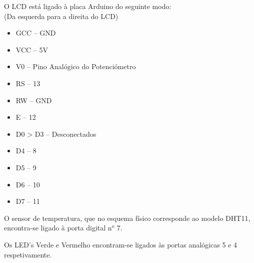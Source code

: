 O LCD está ligado à placa Arduino do seguinte modo:\\
(Da esquerda para a direita do LCD)
\begin{itemize}
    \item GCC -- GND
    \item VCC -- 5V
    \item V0 -- Pino Analógico do Potenciómetro
    \item RS -- 13
    \item RW -- GND
    \item E -- 12
    \item D0 > D3 -- Desconectados
    \item D4 -- 8
    \item D5 -- 9
    \item D6 -- 10
    \item D7 -- 11
\end{itemize}

O sensor de temperatura, que no esquema físico corresponde ao modelo DHT11, encontra-se ligado à porta digital n$^{o}$ 7.

Os LED's Verde e Vermelho encontram-se ligados às portas analógicas 5 e 4 respetivamente.
